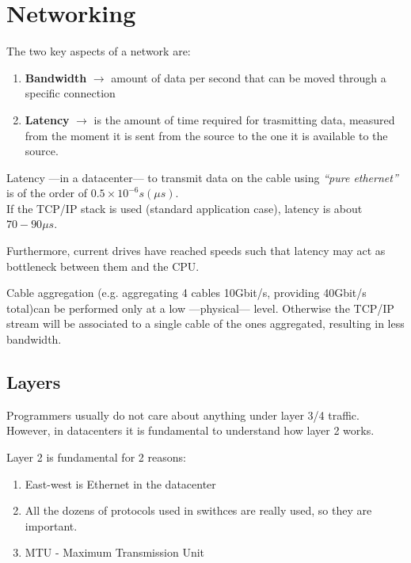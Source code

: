 \chapter{Networking}
The two key aspects of a network are:
\begin{enumerate}
   \item \textbf{Bandwidth} $\longrightarrow$ amount of data per second that can be moved through a specific connection
   \item \textbf{Latency} $\longrightarrow$ is the amount of time required for trasmitting data, measured from the moment it is sent from the source to the one it is available to the source.
\end{enumerate}
Latency ---in a datacenter--- to transmit data on the cable using \textit{``pure ethernet''} is of the order of $0.5\times10^{-6}s (\mu s)$.\\
If the TCP/IP stack is used (standard application case), latency is about $70-90\mu s$.

Furthermore, current drives have reached speeds such that latency may act as bottleneck between them and the CPU.

Cable aggregation (e.g. aggregating 4 cables 10Gbit/s, providing 40Gbit/s total)can be performed only at a low ---physical--- level. Otherwise the TCP/IP stream will be associated to a single cable of the ones aggregated, resulting in less bandwidth.


\section{Layers}
Programmers usually do not care about anything under layer 3/4 traffic.
However, in datacenters it is fundamental to understand how layer 2 works.

Layer 2 is fundamental for 2 reasons:
\begin{enumerate}
   \item East-west is Ethernet in the datacenter
   \item All the dozens of protocols used in swithces are really used, so they are important.
   \item MTU - Maximum Transmission Unit
\end{enumerate}

